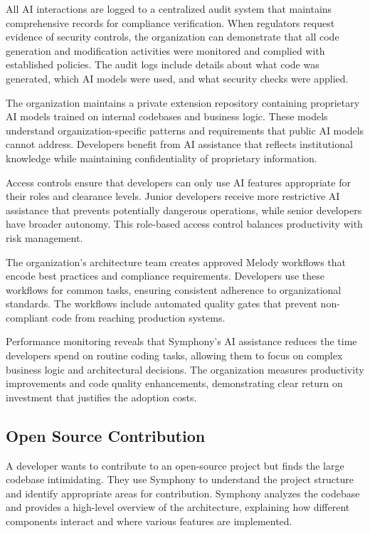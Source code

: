 All AI interactions are logged to a centralized audit system that maintains comprehensive records for compliance verification. When regulators request evidence of security controls, the organization can demonstrate that all code generation and modification activities were monitored and complied with established policies. The audit logs include details about what code was generated, which AI models were used, and what security checks were applied.

The organization maintains a private extension repository containing proprietary AI models trained on internal codebases and business logic. These models understand organization-specific patterns and requirements that public AI models cannot address. Developers benefit from AI assistance that reflects institutional knowledge while maintaining confidentiality of proprietary information.

Access controls ensure that developers can only use AI features appropriate for their roles and clearance levels. Junior developers receive more restrictive AI assistance that prevents potentially dangerous operations, while senior developers have broader autonomy. This role-based access control balances productivity with risk management.

The organization's architecture team creates approved Melody workflows that encode best practices and compliance requirements. Developers use these workflows for common tasks, ensuring consistent adherence to organizational standards. The workflows include automated quality gates that prevent non-compliant code from reaching production systems.

Performance monitoring reveals that Symphony's AI assistance reduces the time developers spend on routine coding tasks, allowing them to focus on complex business logic and architectural decisions. The organization measures productivity improvements and code quality enhancements, demonstrating clear return on investment that justifies the adoption costs.

\subsection{Open Source Contribution}
\label{subsec:open-source-contribution}

A developer wants to contribute to an open-source project but finds the large codebase intimidating. They use Symphony to understand the project structure and identify appropriate areas for contribution. Symphony analyzes the codebase and provides a high-level overview of the architecture, explaining how different components interact and where various features are implemented.

